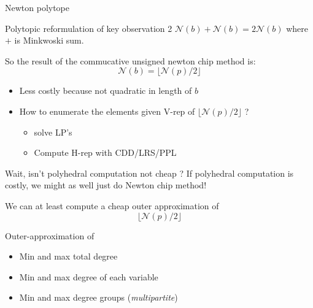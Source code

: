 \documentclass{beamer}
\newcommand{\newtonpoly}[1]{\mathcal{N}(#1)}
\begin{document}
\begin{frame}{Newton polytope}
    \begin{block}{Polytopic reformulation of key observation 2}
        $\newtonpoly{b} + \newtonpoly{b} = 2\newtonpoly{b}$ where $+$ is Minkwoski sum.
    \end{block}
    So the result of the commucative unsigned newton chip method is:
    $$\newtonpoly{b} = \lfloor \mathcal{N}(p) / 2 \rfloor$$
    \vspace{-2em}
    \begin{itemize}
        \item Less costly because not quadratic in length of $b$
        \item How to enumerate the elements given V-rep of $\lfloor \mathcal{N}(p) / 2 \rfloor$ ?
        \begin{itemize}
            \item solve LP's~\autocite{Lofberg2009}
            \item Compute H-rep with CDD/LRS/PPL~\autocite{prajna2004new}
        \end{itemize}
    \end{itemize}
\end{frame}

\begin{frame}{Wait, isn't polyhedral computation not cheap ?}
    If polyhedral computation is costly, we might as well just do Newton chip method!

    We can at least compute a cheap outer approximation of
    $$\lfloor \mathcal{N}(p) / 2 \rfloor$$
    \begin{block}{Outer-approximation of \autocite{prajna2004new}}
        \begin{itemize}
            \item Min and max total degree
            \item Min and max degree of each variable
            \item Min and max degree groups (\emph{multipartite})
        \end{itemize}
    \end{block}
\end{frame}
\end{document}

